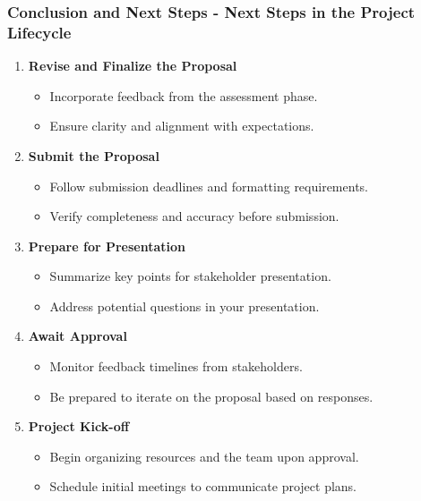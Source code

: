 \documentclass[aspectratio=169]{beamer}
\begin{document}
\begin{frame}[fragile]
    \frametitle{Conclusion and Next Steps - Next Steps in the Project Lifecycle}
    
    \begin{enumerate}
        \item \textbf{Revise and Finalize the Proposal}
        \begin{itemize}
            \item Incorporate feedback from the assessment phase.
            \item Ensure clarity and alignment with expectations.
        \end{itemize}
        
        \item \textbf{Submit the Proposal}
        \begin{itemize}
            \item Follow submission deadlines and formatting requirements.
            \item Verify completeness and accuracy before submission.
        \end{itemize}
        
        \item \textbf{Prepare for Presentation}
        \begin{itemize}
            \item Summarize key points for stakeholder presentation.
            \item Address potential questions in your presentation.
        \end{itemize}
        
        \item \textbf{Await Approval}
        \begin{itemize}
            \item Monitor feedback timelines from stakeholders.
            \item Be prepared to iterate on the proposal based on responses.
        \end{itemize}
        
        \item \textbf{Project Kick-off}
        \begin{itemize}
            \item Begin organizing resources and the team upon approval.
            \item Schedule initial meetings to communicate project plans.
        \end{itemize}
    \end{enumerate}
\end{frame}
\end{document}
